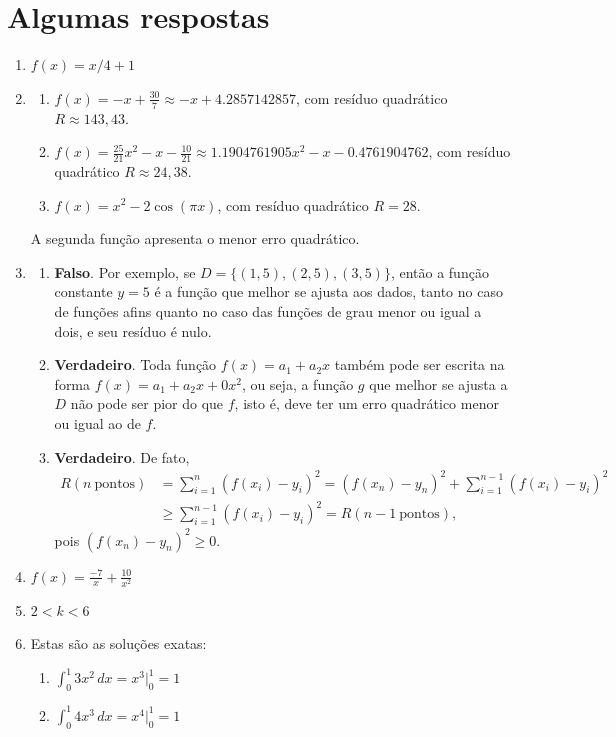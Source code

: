 \documentclass[12pt,a4paper]{article}
\begin{document}
\newpage
\section*{Algumas respostas}

\begin{enumerate}
\item $f(x) = x/4 + 1$
\item \begin{enumerate}
\item $f(x) = -x + \frac{30}{7} \approx -x + 4.2857142857$, com resíduo quadrático $R \approx 143,43$.
\item $f(x) = \frac{25}{21}x^2 - x-\frac{10}{21} \approx 1.1904761905x^2 - x - 0.4761904762$, com resíduo quadrático $R \approx 24,38$.
\item $f(x) = x^2 - 2\cos(\pi x)$, com resíduo quadrático $R = 28$.
\end{enumerate}
A segunda função apresenta o menor erro quadrático.
\item 
\begin{enumerate}
\item \textbf{Falso}. Por exemplo, se $D = \{(1,5), (2,5), (3,5)\}$, então a função constante $y = 5$ é a função que melhor se ajusta aos dados, tanto no caso de funções afins quanto no caso das funções de grau menor ou igual a dois, e seu resíduo é nulo.
\item \textbf{Verdadeiro}. Toda função $f(x) = a_1 + a_2 x$ também pode ser escrita na forma $f(x) = a_1 + a_2 x + 0 x^2$, ou seja, a função $g$ que melhor se ajusta a $D$ não pode ser pior do que $f$, isto é, deve ter um erro quadrático menor ou igual ao de $f$.
\item \textbf{Verdadeiro}. De fato,
\begin{align*}
R(n\ \text{pontos})
& = \sum_{i=1}^n (f(x_i)-y_i)^2
= (f(x_n)-y_n)^2 + \sum_{i=1}^{n-1} (f(x_i)-y_i)^2 \\
& \geq \sum_{i=1}^{n-1} (f(x_i)-y_i)^2
= R(n-1\ \text{pontos}),
\end{align*}
pois $(f(x_n)-y_n)^2 \geq 0$.
\end{enumerate}
\item $f(x) = \frac{-7}{x} + \frac{10}{x^2}$
\item $2 < k < 6$
\item Estas são as soluções exatas:
\begin{enumerate}
\item $\int_0^1 3x^2 \,dx = x^3 \Big|_0^1 = 1$
\item $\int_0^1 4x^3 \,dx = x^4 \Big|_0^1 = 1$

\end{enumerate}
\end{enumerate}
\end{document}
